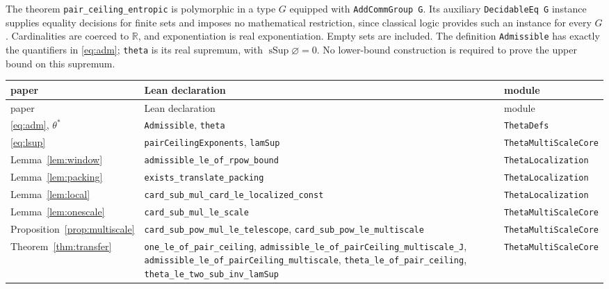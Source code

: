 \documentclass[11pt]{amsart}
\theoremstyle{definition}
\theoremstyle{remark}
\numberwithin{equation}{section}
\newcommand{\R}{\mathbb{R}}
\newcommand{\lean}[1]{\texttt{#1}}
\begin{document}
The theorem \lean{pair\_\allowbreak{}ceiling\_\allowbreak{}entropic} is polymorphic in a type
$G$ equipped with \lean{AddCommGroup G}. Its auxiliary
\lean{DecidableEq G} instance supplies equality decisions for finite
sets and imposes no mathematical restriction, since classical logic
provides such an instance for every $G$. Cardinalities are coerced
to $\R$, and exponentiation is real exponentiation. Empty sets are
included. The definition \lean{Admissible} has exactly the quantifiers
in \eqref{eq:adm}; \lean{theta} is its real supremum, with
$\operatorname{sSup}\varnothing=0$. No lower-bound construction is
required to prove the upper bound on this supremum.

\medskip
\noindent
{\small
\begin{longtable}{@{}>{\raggedright\arraybackslash}p{2.6cm}>{\raggedright\arraybackslash}p{7.5cm}>{\raggedright\arraybackslash}p{4.6cm}@{}}
\toprule
paper & Lean declaration & module\\
\midrule
\endfirsthead
\toprule
paper & Lean declaration & module\\
\midrule
\endhead
\eqref{eq:adm}, $\theta^\ast$ & \lean{Admissible}, \lean{theta} & \lean{ThetaDefs}\\
\eqref{eq:lsup} & \lean{pairCeilingExponents}, \lean{lamSup} & \lean{ThetaMultiScaleCore}\\
Lemma~\ref{lem:window} & \lean{admissible\_\allowbreak{}le\_\allowbreak{}of\_\allowbreak{}rpow\_\allowbreak{}bound} & \lean{ThetaLocalization}\\
Lemma~\ref{lem:packing} & \lean{exists\_\allowbreak{}translate\_\allowbreak{}packing} & \lean{ThetaLocalization}\\
Lemma~\ref{lem:local} & \lean{card\_\allowbreak{}sub\_\allowbreak{}mul\_\allowbreak{}card\_\allowbreak{}le\_\allowbreak{}localized\_\allowbreak{}const} & \lean{ThetaLocalization}\\
Lemma~\ref{lem:onescale} & \lean{card\_\allowbreak{}sub\_\allowbreak{}mul\_\allowbreak{}le\_\allowbreak{}scale} & \lean{ThetaMultiScaleCore}\\
Proposition~\ref{prop:multiscale} & \lean{card\_\allowbreak{}sub\_\allowbreak{}pow\_\allowbreak{}mul\_\allowbreak{}le\_\allowbreak{}telescope}, \lean{card\_\allowbreak{}sub\_\allowbreak{}pow\_\allowbreak{}le\_\allowbreak{}multiscale} & \lean{ThetaMultiScaleCore}\\
Theorem~\ref{thm:transfer} & \lean{one\_\allowbreak{}le\_\allowbreak{}of\_\allowbreak{}pair\_\allowbreak{}ceiling}, \lean{admissible\_\allowbreak{}le\_\allowbreak{}of\_\allowbreak{}pairCeiling\_\allowbreak{}multiscale\_\allowbreak{}J}, \lean{admissible\_\allowbreak{}le\_\allowbreak{}of\_\allowbreak{}pairCeiling\_\allowbreak{}multiscale}, \lean{theta\_\allowbreak{}le\_\allowbreak{}of\_\allowbreak{}pair\_\allowbreak{}ceiling}, \lean{theta\_\allowbreak{}le\_\allowbreak{}two\_\allowbreak{}sub\_\allowbreak{}inv\_\allowbreak{}lamSup} & \lean{ThetaMultiScaleCore}\\

\end{longtable}}
\end{document}
